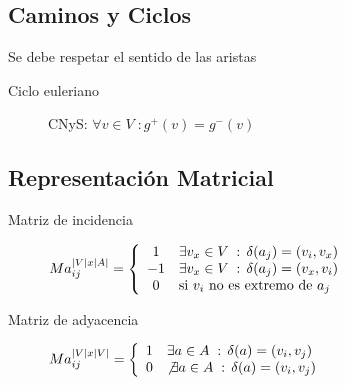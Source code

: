 \documentclass[a4paper]{article}
\numberwithin{equation}{section}
\numberwithin{figure}{section}
\numberwithin{table}{section}
\newcommand{\talque}{\;:\,} %
\begin{document}
\subsection{Caminos y Ciclos}
Se debe respetar el sentido de las aristas
\begin{description}
	\item[Ciclo euleriano] CNyS: $\forall v \in V \;: g^+(v) = g^-(v)$
\end{description}

\subsection{Representaci\'on Matricial}
\begin{description}
	\item[Matriz de incidencia] $Ma_{ij}^{|V|x|A|} = \left\{
\begin{array}{c l}
 1 & \exists v_x \in V \talque \delta(a_j) = (v_i, v_x)\\
 -1 & \exists v_x \in V \talque \delta(a_j) = (v_x, v_i)\\
 0 & \textup{si $v_i$ no es extremo de } a_j\\
\end{array}
\right.
$
    \item[Matriz de adyacencia]$Ma_{ij}^{|V|x|V|} = \left\{
\begin{array}{c l}
 1 & \exists a \in A \talque \delta(a) = (v_i, v_j)\\
 0 & \not \exists a \in A \talque \delta(a) = (v_i, v_j)\\
\end{array}
\right.
$
\end{description}

\end{document}

